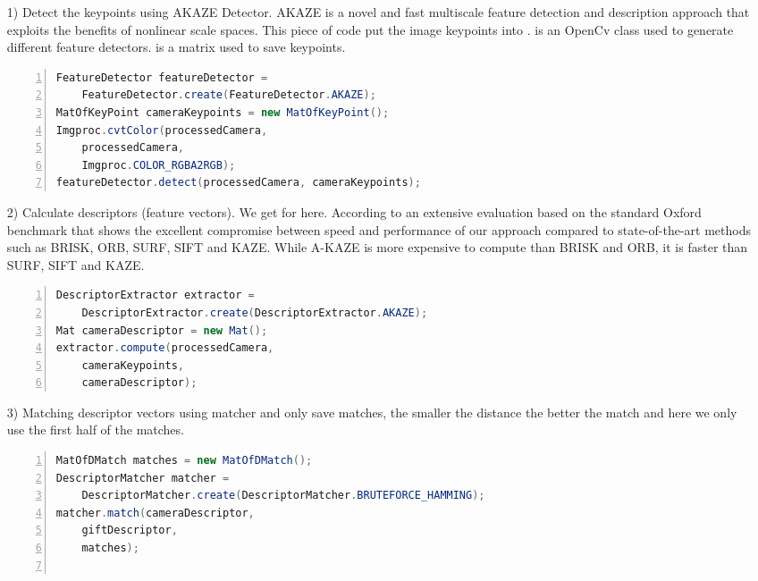 \begin{enumerate}
\item[1)] Detect the keypoints using {\ttfamily AKAZE} Detector. {\ttfamily AKAZE} is a novel and fast multiscale feature detection and description approach that exploits the benefits of nonlinear scale spaces.\cite{alcantarilla2011fast} This piece of code put the  image keypoints into .  is an OpenCv class used to generate different feature detectors.  is a matrix used to save keypoints.

\begin{lstlisting}[caption={Detect the Keypoints},language={java},
        numbers=left,basicstyle=\footnotesize\ttfamily,breaklines=true,xleftmargin=.05\textwidth, xrightmargin=.05\textwidth]
FeatureDetector featureDetector =
    FeatureDetector.create(FeatureDetector.AKAZE);
MatOfKeyPoint cameraKeypoints = new MatOfKeyPoint();
Imgproc.cvtColor(processedCamera, 
    processedCamera,
    Imgproc.COLOR_RGBA2RGB);
featureDetector.detect(processedCamera, cameraKeypoints);
\end{lstlisting} 

\item[2)] Calculate descriptors (feature vectors). We get  for  here. According to an extensive evaluation based on the standard Oxford benchmark \cite{mikolajczyk2005} that shows the excellent compromise between speed and performance of our approach compared to state-of-the-art methods such as BRISK, ORB, SURF, SIFT and KAZE. While A-KAZE is more expensive to compute than BRISK and ORB, it is faster than SURF, SIFT and KAZE.\cite{alcantarilla2011fast}
\begin{lstlisting}[caption={Calculate Descriptors},language={java},
        numbers=left,basicstyle=\footnotesize\ttfamily,breaklines=true,xleftmargin=.05\textwidth, xrightmargin=.05\textwidth]
DescriptorExtractor extractor =
    DescriptorExtractor.create(DescriptorExtractor.AKAZE);
Mat cameraDescriptor = new Mat();
extractor.compute(processedCamera, 
    cameraKeypoints, 
    cameraDescriptor);
\end{lstlisting} 
\item[3)] Matching descriptor vectors using  matcher and only save  matches, the smaller the distance the better the match and here we only use the first half of the matches. 
\begin{lstlisting}[caption={Matching Descriptor Vectors},language={java},
        numbers=left,basicstyle=\footnotesize\ttfamily,breaklines=true,xleftmargin=.05\textwidth, xrightmargin=.05\textwidth]
MatOfDMatch matches = new MatOfDMatch();
DescriptorMatcher matcher =
    DescriptorMatcher.create(DescriptorMatcher.BRUTEFORCE_HAMMING);
matcher.match(cameraDescriptor, 
    giftDescriptor, 
    matches);
            

\end{lstlisting}
\end{enumerate}
